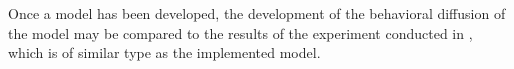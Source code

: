 Once a model has been developed, the development of the behavioral diffusion of
the model may be compared to the results of the experiment conducted in
\cite{centola2010spread}, which is of similar type as the implemented model.


